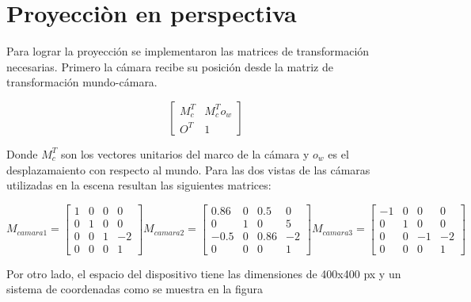 \documentclass[12pt]{article}
\begin{document}
\section{Proyecciòn en perspectiva}

Para lograr la proyección se implementaron las matrices de transformación necesarias. Primero la cámara recibe su posición desde la matriz de transformación mundo-cámara.


\begin{equation}
\begin{bmatrix}
M_{c}^{T} &  M_{c}^{T}o_{w}\\
O^{T} & 1 

\end{bmatrix}
\end{equation} 

Donde $M_{c}^{T} $ son los vectores unitarios del marco de la cámara y $o_{w}$ es el desplazamaiento con respecto al mundo.
Para las dos vistas de las cámaras utilizadas en la escena resultan las siguientes matrices:

$$
M_{camara1}= \begin{bmatrix}
1 & 0 & 0& 0\\
0 & 1 & 0& 0\\
0 & 0 & 1&-2 \\
0 & 0 & 0&1
\end{bmatrix}
M_{camara2}= \begin{bmatrix}
0.86 & 0 & 0.5& 0\\
0 & 1 & 0& 5\\
-0.5 & 0 & 0.86&-2 \\
0 & 0 & 0&1
\end{bmatrix}
M_{camara3}= \begin{bmatrix}
-1 & 0 & 0& 0\\
0 & 1 & 0& 0\\
0 & 0 & -1&-2 \\
0 & 0 & 0&1
\end{bmatrix}
$$


Por otro lado, el espacio del dispositivo tiene las dimensiones de 400x400 px y un sistema de coordenadas como se muestra en la figura
\end{document}
